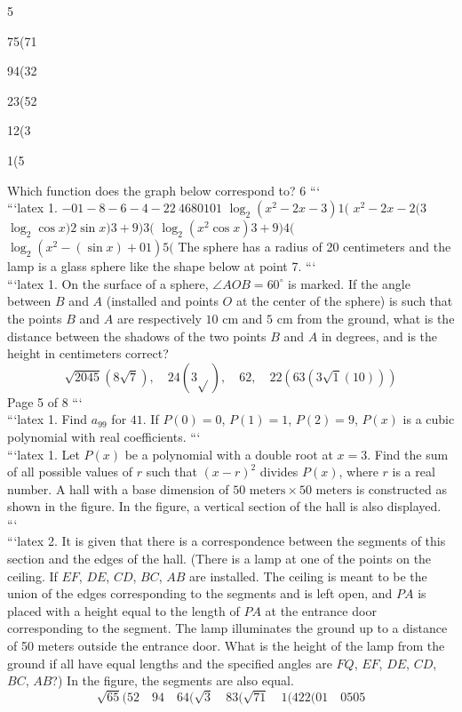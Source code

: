 5

75(71

94(32

23(52

12(3

1(5

Which function does the graph below correspond to? 6
```
\\
```latex
1. 
$-01-8-6-4-22 \ 4680101$
$\log_2(x^2-2x-3)1($
$x^2-2x-2(3$
$\log_2\cos x)2\sin x)3+9)3($
$\log_2(x^2\cos x)3+9)4($
$\log_2(x^2-(\sin x) +01)5($
The sphere has a radius of 20 centimeters and the lamp is a glass sphere like the shape below at point 7.
```
\\
```latex
1. 
On the surface of a sphere, $\angle AOB = 60^\circ$ is marked. If the angle between $B$ and $A$ (installed and points $O$ at the center of the sphere) is such that the points $B$ and $A$ are respectively $10$ cm and $5$ cm from the ground, what is the distance between the shadows of the two points $B$ and $A$ in degrees, and is the height in centimeters correct? 
\[
\sqrt{2045} \left(8 \sqrt{7}\right), \quad 24 \left(3 \sqrt{}\right), \quad 62, \quad 22 \left(63 \left(3 \sqrt{1} \left(10\right)\right)\right)
\]
Page 5 of 8
```
\\
```latex
1. Find $a_{99}$ for $41$. If $P(0) = 0$, $P(1) = 1$, $P(2) = 9$, $P(x)$ is a cubic polynomial with real coefficients.
```
\\
```latex
1. Let $P(x)$ be a polynomial with a double root at $x = 3$. Find the sum of all possible values of $r$ such that $(x - r)^2$ divides $P(x)$, where $r$ is a real number. A hall with a base dimension of $50 \text{ meters} \times 50 \text{ meters}$ is constructed as shown in the figure. In the figure, a vertical section of the hall is also displayed.
```
\\
```latex
2. It is given that there is a correspondence between the segments of this section and the edges of the hall. (There is a lamp at one of the points on the ceiling. If $EF$, $DE$, $CD$, $BC$, $AB$ are installed. The ceiling is meant to be the union of the edges corresponding to the segments and is left open, and $PA$ is placed with a height equal to the length of $PA$ at the entrance door corresponding to the segment. The lamp illuminates the ground up to a distance of 50 meters outside the entrance door. What is the height of the lamp from the ground if all have equal lengths and the specified angles are $FQ$, $EF$, $DE$, $CD$, $BC$, $AB$?) In the figure, the segments are also equal. 
\[
\sqrt{65}(52 \quad 94 \quad 64(\sqrt{3} \quad 83(\sqrt{71} \quad 1(422(01 \quad 0505
\]
